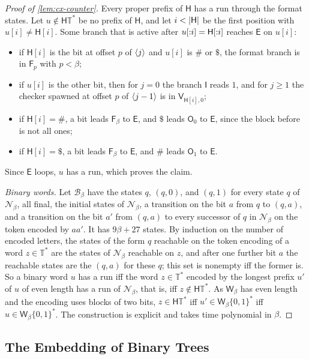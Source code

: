 \begin{proof}[Proof of \cref{lem:cx-counter}]
Every proper prefix of $\mathsf H$ has a run through the format states. Let
$u\notin\mathsf H\mathbb T^*$ be no prefix of $\mathsf H$, and let $i<\lvert \mathsf H\rvert$ be
the first position with $u[i]\ne\mathsf H[i]$. Some branch that is active after
$u[{:}i]=\mathsf H[{:}i]$ reaches $\mathsf E$ on $u[i]$:
\begin{itemize}[leftmargin=*]
\item if $\mathsf H[i]$ is the bit at offset $p$ of $\langle j\rangle$ and $u[i]$ is
  $\#$ or $\$$, the format branch is in $\mathsf F_p$ with $p<\beta$;
\item if $u[i]$ is the other bit, then for $j=0$ the branch $\mathsf I$ reads
  $1$, and for $j\ge1$ the checker spawned at offset $p$ of $\langle j-1\rangle$ is in
  $\mathsf V_{\mathsf H[i],0}$;
\item if $\mathsf H[i]=\#$, a bit leads $\mathsf F_\beta$ to $\mathsf E$, and $\$$
  leads $\mathsf O_0$ to $\mathsf E$, since the block before is not all ones;
\item if $\mathsf H[i]=\$$, a bit leads $\mathsf F_\beta$ to $\mathsf E$, and $\#$
  leads $\mathsf O_1$ to $\mathsf E$.
\end{itemize}
Since $\mathsf E$ loops, $u$ has a run, which proves the claim.

\emph{Binary words.} Let $\mathcal B_\beta$ have the states $q$, $(q,0)$, and
$(q,1)$ for every state $q$ of $\mathcal N_\beta$, all final, the initial states
of $\mathcal N_\beta$, a transition on the bit $a$ from $q$ to $(q,a)$, and a
transition on the bit $a'$ from $(q,a)$ to every successor of $q$ in
$\mathcal N_\beta$ on the token encoded by $aa'$. It has $9\beta+27$
states. By induction on the number of encoded letters, the states of the form
$q$ reachable on the token encoding of a word $z\in\mathbb T^*$ are the states of
$\mathcal N_\beta$ reachable on $z$, and after one further bit $a$ the reachable
states are the $(q,a)$ for these $q$; this set is nonempty iff the former is.
So a binary word $u$ has a run iff the word $z\in\mathbb T^*$ encoded by the longest
prefix $u'$ of $u$ of even length has a run of $\mathcal N_\beta$, that is, iff
$z\notin\mathsf H\mathbb T^*$. As $\mathsf W_\beta$ has even length and the encoding uses
blocks of two bits, $z\in\mathsf H\mathbb T^*$ iff $u'\in\mathsf W_\beta\{0,1\}^*$ iff
$u\in\mathsf W_\beta\{0,1\}^*$. The construction is explicit and takes time
polynomial in $\beta$.
\end{proof}

\subsection{The Embedding of Binary Trees}

